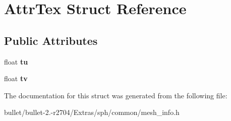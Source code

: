 \hypertarget{struct_attr_tex}{\section{Attr\+Tex Struct Reference}
\label{struct_attr_tex}
}
\subsection*{Public Attributes}
\begin{DoxyCompactItemize}
\item 
\hypertarget{struct_attr_tex_abffbd80f491f86d0c6425431753004c8}{float {\bfseries tu}}\label{struct_attr_tex_abffbd80f491f86d0c6425431753004c8}

\item 
\hypertarget{struct_attr_tex_a84521dfa6ef3f50da17943504877bbb1}{float {\bfseries tv}}\label{struct_attr_tex_a84521dfa6ef3f50da17943504877bbb1}

\end{DoxyCompactItemize}


The documentation for this struct was generated from the following file\+:\begin{DoxyCompactItemize}
\item 
bullet/bullet-\/2.-\/r2704/\+Extras/sph/common/mesh\+\_\+info.\+h\end{DoxyCompactItemize}
